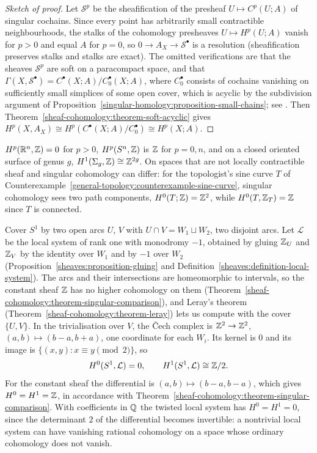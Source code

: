 \begin{proof}[Sketch of proof]
Let $\mathcal{S}^p$ be the sheafification of the presheaf $U \mapsto C^p(U; A)$ of singular cochains. Since every point has arbitrarily small contractible neighbourhoods, the stalks of
the cohomology presheaves $U \mapsto H^p(U; A)$ vanish for $p > 0$ and equal $A$ for $p = 0$, so $0 \to A_X \to \mathcal{S}^\bullet$ is a resolution (sheafification preserves stalks and
stalks are exact). The omitted verifications are that the sheaves $\mathcal{S}^p$ are soft on a paracompact space, and that
$\Gamma(X, \mathcal{S}^\bullet) = C^\bullet(X; A)/C^\bullet_0(X; A)$, where $C^\bullet_0$ consists of cochains vanishing on sufficiently small simplices of some open cover, which is acyclic by
the subdivision argument of Proposition~\ref{singular-homology:proposition-small-chains}; see \cite[Chapter III]{bredon-sheaf}. Then
Theorem~\ref{sheaf-cohomology:theorem-soft-acyclic} gives $H^p(X, A_X) \cong H^p(C^\bullet(X; A)/C_0^\bullet) \cong H^p(X; A)$.
\end{proof}

\begin{example}\label{sheaf-cohomology:example-constant-sheaf-cohomology}
$H^p(\mathbb{R}^n, \mathbb{Z}) = 0$ for $p > 0$, $H^p(S^n, \mathbb{Z})$ is $\mathbb{Z}$ for $p = 0, n$, and on a closed oriented surface of genus $g$, $H^1(\Sigma_g, \mathbb{Z}) \cong \mathbb{Z}^{2g}$. On spaces that are not locally
contractible sheaf and singular cohomology can differ: for the topologist's sine curve $T$ of Counterexample~\ref{general-topology:counterexample-sine-curve}, singular cohomology sees two
path components, $H^0(T; \mathbb{Z}) = \mathbb{Z}^2$, while $H^0(T, \mathbb{Z}_T) = \mathbb{Z}$ since $T$ is connected.
\end{example}

\begin{example}\label{sheaf-cohomology:example-mobius-local-system}
Cover $S^1$ by two open arcs $U$, $V$ with $U \cap V = W_1 \sqcup W_2$, two disjoint arcs. Let $\mathcal{L}$ be the local system of rank one with monodromy $-1$, obtained by gluing $\mathbb{Z}_U$ and $\mathbb{Z}_V$ by the identity over
$W_1$ and by $-1$ over $W_2$ (Proposition~\ref{sheaves:proposition-gluing} and Definition~\ref{sheaves:definition-local-system}). The arcs and their intersections are homeomorphic to intervals, so the constant sheaf $\mathbb{Z}$ has no
higher cohomology on them (Theorem~\ref{sheaf-cohomology:theorem-singular-comparison}), and Leray's theorem (Theorem~\ref{sheaf-cohomology:theorem-leray}) lets us compute with the cover $\{U, V\}$. In the trivialisation over $V$,
the \v{C}ech complex is $\mathbb{Z}^2 \to \mathbb{Z}^2$, $(a, b) \mapsto (b - a, b + a)$, one coordinate for each $W_i$. Its kernel is $0$ and its image is $\{(x, y) : x \equiv y \pmod 2\}$, so
\[
H^0(S^1, \mathcal{L}) = 0, \qquad H^1(S^1, \mathcal{L}) \cong \mathbb{Z}/2 .
\]
For the constant sheaf the differential is $(a, b) \mapsto (b - a, b - a)$, which gives $H^0 = H^1 = \mathbb{Z}$, in accordance with Theorem~\ref{sheaf-cohomology:theorem-singular-comparison}. With coefficients in $\mathbb{Q}$ the twisted local system
has $H^0 = H^1 = 0$, since the determinant $2$ of the differential becomes invertible: a nontrivial local system can have vanishing rational cohomology on a space whose ordinary cohomology does not vanish.
\end{example}

